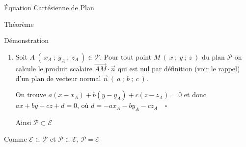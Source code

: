 \documentclass{cours}
\begin{document}
\begin{Gpartie}{Équation Cartésienne de Plan}
\begin{Spartie}{Théorème}
\begin{SSpartie}{Démonstration}
\begin{enumerate}[(1)]
                    Quel que soit 
                    $\begin{aligned}[t]
                        M~\left(~x~;~y~;~z~\right)\in\mathcal{E},~\overrightarrow{AM}\cdot\vec{n}=0&\iff\begin{psmallmatrix} x-\frac{-d}{a} \\ y \\ z\end{psmallmatrix}\cdot \begin{psmallmatrix}a \\ b \\ c\end{psmallmatrix} \\ &\iff a x+by+cz+d=0 %
                    \end{aligned}$

                    Donc, tout point $M$ de $\mathcal{E}$ vérifie $\overrightarrow{AM}\cdot\vec{n}=0$, donc appartient au plan passant par $A$ et de vecteur normal $\vec{n}$. (c'est la caractérisation d'un plan) $\quad\square$

                    Ainsi, $\mathcal{E}\subset\mathcal{P}$

                    \item   Soit $A~\left(~x_A~;~y_A~;~z_A~\right)\in\mathcal{P}$. Pour tout point $M~\left(~x~;~y~;~z~\right)$ du plan $\mathcal{P}$ on calcule le produit scalaire $\overrightarrow{AM}\cdot\vec{n}$ qui est nul par définition (voir le rappel) d'un plan de vecteur normal $\vec{n}~\left(~a~;~b~;~c~\right)$.
                    
                    On trouve $a\left(x-x_A\right)+b\left(y-y_A\right)+c\left(z-z_A\right)=0$ et donc $ax+by+cz+d=0$, où $d=-ax_A-by_A-cz_A\quad\square$

                    Ainsi $\mathcal{P}\subset\mathcal{E}$
                \end{enumerate}
                \vspace*{2ex}
                Comme $\mathcal{E}\subset\mathcal{P}$ et $\mathcal{P}\subset\mathcal{E}$, $\mathcal{P}=\mathcal{E}$
            \end{SSpartie}
        \end{Spartie}
    \end{Gpartie}
\end{document}

